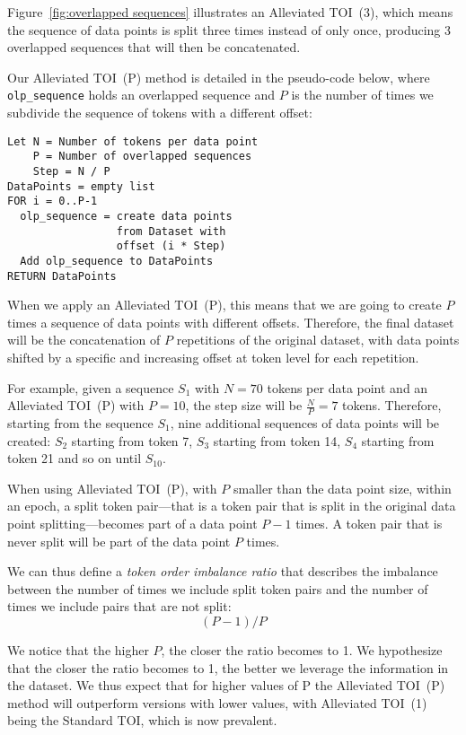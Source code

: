 \documentclass[11pt,a4paper]{article}
\begin{document}
Figure~\ref{fig:overlapped sequences} illustrates an Alleviated TOI~(3), which means the sequence of data points is split three times instead of only once, producing 3 overlapped sequences that will then be concatenated.


Our Alleviated TOI~(P) method is detailed in the pseudo-code below, where {\small\verb|olp_sequence|} holds an overlapped sequence and $P$ is the number of times we subdivide the sequence of tokens with a different offset:

\vspace{1em}
\begin{small}
\begin{verbatim}
Let N = Number of tokens per data point
    P = Number of overlapped sequences
    Step = N / P
DataPoints = empty list
FOR i = 0..P-1
  olp_sequence = create data points 
                 from Dataset with 
                 offset (i * Step)
  Add olp_sequence to DataPoints
RETURN DataPoints
\end{verbatim}
\end{small}

When we apply an Alleviated TOI~(P), this means that we are going to create $P$ times a sequence of data points with different offsets. Therefore, the final dataset will be the concatenation of $P$ repetitions of the original dataset, with data points shifted by a specific and increasing offset at token level for each repetition.

For example, given a sequence $S_1$ with $N = 70$ tokens per data point and an Alleviated TOI~(P) with $P = 10$, the step size will be $\frac{N}{P}=7$ tokens. Therefore, starting from the sequence $S_1$, nine additional sequences of data points will be created: $S_2$ starting from token 7, $S_3$ starting from token 14, $S_4$ starting from token 21 and so on until $S_{10}$.

When using Alleviated TOI~(P), with $P$ smaller than the data point size, within an epoch, a split token pair---that is a token pair that is split in the original data point splitting---becomes part of a data point $P-1$ times. A token pair that is never split will be part of the data point $P$ times.

We can thus define a \textit{token order imbalance ratio} that describes the imbalance between the number of times we include split token pairs and the number of times we include pairs that are not split: 
\[
(P-1) / P
\]

We notice that the higher $P$, the closer the ratio becomes to 1. We hypothesize that the closer the ratio becomes to 1, the better we leverage the information in the dataset. We thus expect that for higher values of P the Alleviated TOI~(P) method will outperform versions with lower values, with Alleviated TOI~(1) being the Standard TOI, which is now prevalent.
\end{document}
